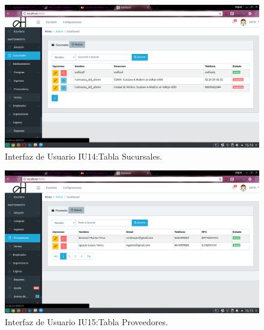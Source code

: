 \begin{figure}[htbp!]
	\begin{center}
\includegraphics[width=\textwidth]{Pantallas/tablaSucursales}
		\caption{Interfaz de Usuario IU14:Tabla Sucursales.}
	\end{center}
\end{figure}



\begin{figure}[htbp!]
	\begin{center}
\includegraphics[width=\textwidth]{Pantallas/tablaProveedores}
		\caption{Interfaz de Usuario IU15:Tabla Proveedores.}
	\end{center}
\end{figure}



